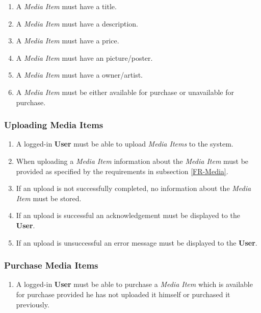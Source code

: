 \begin{enumerate}[label=\textbf{FR-\twodigits*}, resume]
	\item A \textit{Media Item} must have a title.
	\item A \textit{Media Item} must have a description.
	\item A \textit{Media Item} must have a price.
	\item A \textit{Media Item} must have an picture/poster.
	\item A \textit{Media Item} must have a owner/artist.
	\item A \textit{Media Item} must be either available for purchase or unavailable for purchase.
\end{enumerate}

\subsubsection {Uploading Media Items}

\begin{enumerate}[label=\textbf{FR-\twodigits*}, resume]
	\item A logged-in \textbf{User} must be able to upload \textit{Media Items} to the system.
	\item When uploading a \textit{Media Item} information about the \textit{Media Item} must be provided as specified by the requirements in subsection \ref{FR-Media}.
	\item If an upload is not successfully completed, no information about the \textit{Media Item} must be stored.
	\item If an upload is successful an acknowledgement must be displayed to the \textbf{User}.
	\item If an upload is unsuccessful an error message must be displayed to the \textbf{User}. 
\end{enumerate}

\subsubsection {Purchase Media Items}

\begin{enumerate}[label=\textbf{FR-\twodigits*}, resume]
	\item A logged-in \textbf{User} must be able to purchase a \textit{Media Item} which is available for purchase provided he has not uploaded it himself or  purchased it previously.
\end{enumerate}

